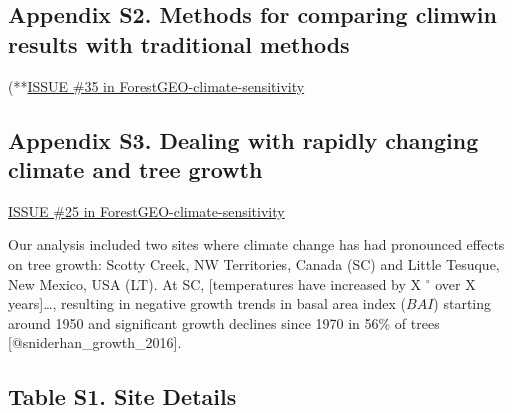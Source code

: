 \documentclass[
]{article}
\begin{document}
\newpage

\hypertarget{appendix-s2.-methods-for-comparing-climwin-results-with-traditional-methods}{%
\subsection{Appendix S2. Methods for comparing climwin results with
traditional
methods}\label{appendix-s2.-methods-for-comparing-climwin-results-with-traditional-methods}}

(**\href{https://github.com/EcoClimLab/ForestGEO-climate-sensitivity/issues/35}{ISSUE
\#35 in ForestGEO-climate-sensitivity}

\newpage

\hypertarget{appendix-s3.-dealing-with-rapidly-changing-climate-and-tree-growth}{%
\subsection{Appendix S3. Dealing with rapidly changing climate and tree
growth}\label{appendix-s3.-dealing-with-rapidly-changing-climate-and-tree-growth}}

\href{https://github.com/EcoClimLab/ForestGEO-climate-sensitivity/issues/25}{ISSUE
\#25 in ForestGEO-climate-sensitivity}

Our analysis included two sites where climate change has had pronounced
effects on tree growth: Scotty Creek, NW Territories, Canada (SC) and
Little Tesuque, New Mexico, USA (LT). At SC, {[}temperatures have
increased by X \(^\circ\) over X years{]}\ldots, resulting in negative
growth trends in basal area index (\(BAI\)) starting around 1950 and
significant growth declines since 1970 in 56\% of trees
{[}@sniderhan\_growth\_2016{]}.

\newpage

\hypertarget{table-s1.-site-details}{%
\subsection{Table S1. Site Details}\label{table-s1.-site-details}}
\end{document}
